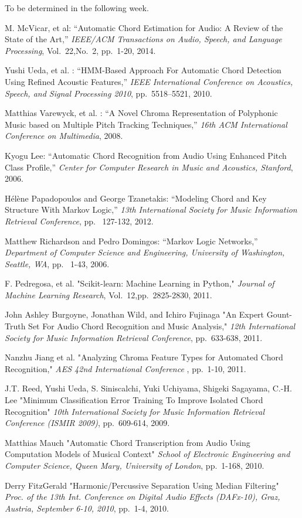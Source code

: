 \documentclass{article}
\begin{document}
To be determined in the following week.


\begin{thebibliography}{citations}

M. McVicar, et al:
``Automatic Chord Estimation for Audio: A Review of the State of the Art,''
{\it IEEE/ACM Transactions on Audio, Speech, and Language Processing},
Vol.~22,No.~2, pp.~1-20, 2014.

Yushi Ueda, et al. :
``HMM-Based Approach For Automatic Chord Detection Using Refined Acoustic
Features,''
{\it IEEE International Conference on Acoustics, Speech, and Signal
Processing 2010},
pp.~5518--5521, 2010.

Matthias Varewyck, et al. :
``A Novel Chroma Representation of Polyphonic Music based on Multiple Pitch
Tracking Techniques,''
{\it 16th ACM International Conference on Multimedia},
2008.

Kyogu Lee:
``Automatic Chord Recognition from Audio Using Enhanced Pitch Class Profile,''
{\it Center for Computer Research in Music and Acoustics, Stanford},
2006.

Hélène Papadopoulos and George Tzanetakis:
``Modeling Chord and Key Structure With Markov Logic,''
{\it 13th International Society for Music Information Retrieval Conference},
pp. ~127-132, 2012.

Matthew Richardson and Pedro Domingos:
``Markov Logic Networks,''
{\it Department of Computer Science and Engineering, University of Washington,
Seattle, WA},
pp. ~1-43, 2006.

F. Pedregosa, et al.
"Scikit-learn: Machine Learning in Python,"
{\it Journal of Machine Learning Research},
Vol.~12,pp.~2825-2830, 2011.

John Ashley Burgoyne, Jonathan Wild, and Ichiro Fujinaga
"An Expert Gount-Truth Set For Audio Chord Recognition and Music Analysis,"
{\it 12th International Society for Music Information Retrieval Conference},
pp.~633-638, 2011.

Nanzhu Jiang et al.
"Analyzing Chroma Feature Types for Automated Chord Recognition,"
{\it AES 42nd International Conference },
pp.~1-10, 2011.

J.T. Reed, Yushi Ueda, S. Siniscalchi, Yuki Uchiyama, Shigeki Sagayama, C.-H. Lee
"Minimum Classification Error Training To Improve Isolated Chord Recognition"
{\it 10th International Society for Music Information Retrieval Conference (ISMIR 2009)},
pp.~609-614, 2009.

Matthias Mauch
"Automatic Chord Transcription from Audio Using Computation Models of Musical Context"
{\it School of Electronic Engineering and Computer Science, Queen Mary, University of London},
pp.~1-168, 2010.

Derry FitzGerald
"Harmonic/Percussive Separation Using Median Filtering"
{\it Proc. of the 13th Int. Conference on Digital Audio Effects (DAFx-10), Graz, Austria, September 6-10, 2010},
pp.~1-4, 2010.

\end{thebibliography}

%
\end{document}
